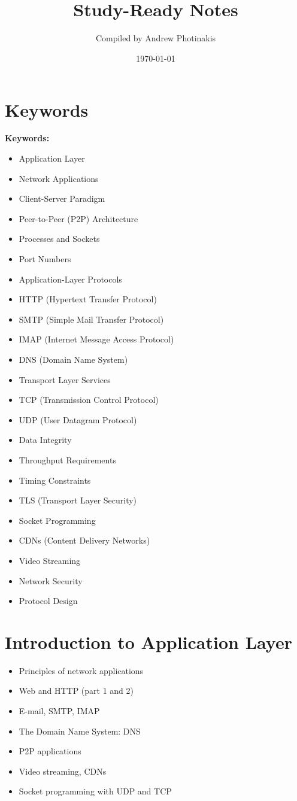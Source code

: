 \documentclass[12pt]{article}
\title{\TOPICTITLE\\\large Study-Ready Notes}
\author{Compiled by Andrew Photinakis}
\date{\today}
\begin{document}
\maketitle
\tableofcontents
\newpage

\section*{Keywords}
\noindent\textbf{Keywords:}
\begin{itemize}
    \item Application Layer
    \item Network Applications
    \item Client-Server Paradigm
    \item Peer-to-Peer (P2P) Architecture
    \item Processes and Sockets
    \item Port Numbers
    \item Application-Layer Protocols
    \item HTTP (Hypertext Transfer Protocol)
    \item SMTP (Simple Mail Transfer Protocol)
    \item IMAP (Internet Message Access Protocol)
    \item DNS (Domain Name System)
    \item Transport Layer Services
    \item TCP (Transmission Control Protocol)
    \item UDP (User Datagram Protocol)
    \item Data Integrity
    \item Throughput Requirements
    \item Timing Constraints
    \item TLS (Transport Layer Security)
    \item Socket Programming
    \item CDNs (Content Delivery Networks)
    \item Video Streaming
    \item Network Security
    \item Protocol Design
\end{itemize}



\section{Introduction to Application Layer}
\begin{itemize}
    \item Principles of network applications
    \item Web and HTTP (part 1 and 2)
    \item E-mail, SMTP, IMAP
    \item The Domain Name System: DNS
    \item P2P applications
    \item Video streaming, CDNs
    \item Socket programming with UDP and TCP
\end{itemize}
\end{document}
